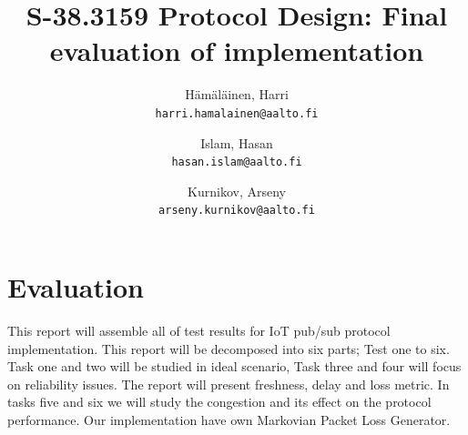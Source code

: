 \documentclass[11pt,a4paper]{report}
\author{Hämäläinen, Harri \\
\texttt{harri.hamalainen@aalto.fi}
\and
Islam, Hasan \\
\texttt{hasan.islam@aalto.fi}
\and
Kurnikov, Arseny \\
\texttt{arseny.kurnikov@aalto.fi}}
\title{S-38.3159 Protocol Design: Final evaluation of implementation}
\begin{document}
\maketitle

\chapter{Evaluation}

This report will assemble all of test results for IoT pub/sub protocol implementation. This report will be decomposed into six parts; Test one to six. Task one and two will be studied in ideal scenario, Task three and four will focus on reliability issues. The report will present freshness, delay and loss metric. In tasks five and six we will study the congestion and its effect on the protocol performance. Our implementation have own Markovian Packet Loss Generator. 





\end{document}
